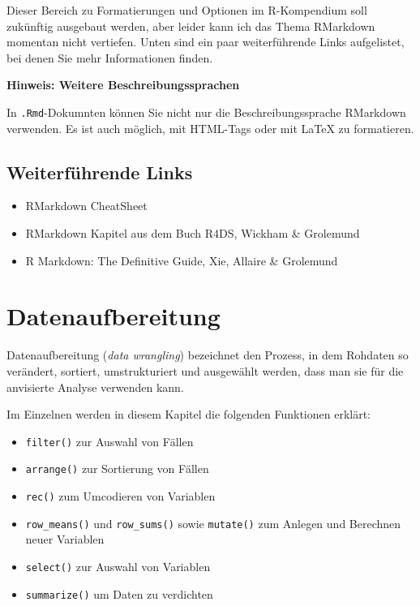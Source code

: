 \documentclass[
]{book}
\begin{document}
Dieser Bereich zu Formatierungen und Optionen im R-Kompendium soll zukünftig ausgebaut werden, aber leider kann ich das Thema RMarkdown momentan nicht vertiefen. Unten sind ein paar weiterführende Links aufgelistet, bei denen Sie mehr Informationen finden.

\leavevmode\hypertarget{info_html}{}%
\textbf{Hinweis: Weitere Beschreibungssprachen}

In \texttt{.Rmd}-Dokumnten können Sie nicht nur die Beschreibungssprache RMarkdown verwenden. Es ist auch möglich, mit HTML-Tags oder mit LaTeX zu formatieren.

\hypertarget{weiterfuxfchrende-links-2}{%
\section{Weiterführende Links}\label{weiterfuxfchrende-links-2}}

\begin{itemize}
\item
  RMarkdown CheatSheet
\item
  RMarkdown Kapitel aus dem Buch R4DS, Wickham \& Grolemund
\item
  R Markdown: The Definitive Guide, Xie, Allaire \& Grolemund
\end{itemize}

\hypertarget{datenaufbereitung}{%
\chapter{Datenaufbereitung}\label{datenaufbereitung}}

Datenaufbereitung (\emph{data wrangling}) bezeichnet den Prozess, in dem Rohdaten so verändert, sortiert, umstrukturiert und ausgewählt werden, dass man sie für die anvisierte Analyse verwenden kann.

Im Einzelnen werden in diesem Kapitel die folgenden Funktionen erklärt:

\begin{itemize}
\item
  \texttt{filter()} zur Auswahl von Fällen
\item
  \texttt{arrange()} zur Sortierung von Fällen
\item
  \texttt{rec()} zum Umcodieren von Variablen
\item
  \texttt{row\_means()} und \texttt{row\_sums()} sowie \texttt{mutate()} zum Anlegen und Berechnen neuer Variablen
\item
  \texttt{select()} zur Auswahl von Variablen
\item
  \texttt{summarize()} um Daten zu verdichten
\end{itemize}
\end{document}
